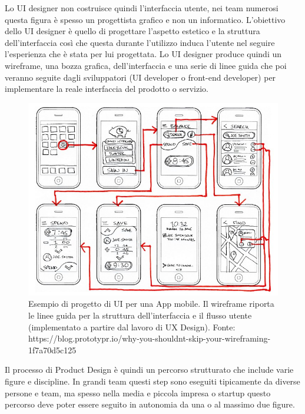 Lo UI designer non costruisce quindi l'interfaccia utente, nei team numerosi questa figura è spesso un progettista grafico e non un informatico. L'obiettivo dello UI designer è quello di progettare l'aspetto estetico e la struttura dell'interfaccia così che questa durante l'utilizzo induca l'utente nel seguire l'esperienza che è stata per lui progettata.
Lo UI designer produce quindi un wireframe, una bozza grafica, dell'interfaccia e una serie di linee guida che poi veranno seguite dagli sviluppatori (UI developer o front-end developer) per implementare la reale interfaccia del prodotto o servizio.

\begin{figure}[!h]
	\centering
	\includegraphics[width=\textwidth]{immagini/uidesign.jpeg}
	\caption{Esempio di progetto di UI per una App mobile. Il wireframe riporta le linee guida per la struttura dell'interfaccia e il flusso utente (implementato a partire dal lavoro di UX Design). Fonte: https://blog.prototypr.io/why-you-shouldnt-skip-your-wireframing-1f7a70d5c125}
\end{figure}



Il processo di Product Design è quindi un percorso strutturato che include varie figure e discipline. In grandi team questi step sono eseguiti tipicamente da diverse persone e team, ma spesso nella media e piccola impresa o startup questo percorso deve poter essere seguito in autonomia da una o al massimo due figure.

